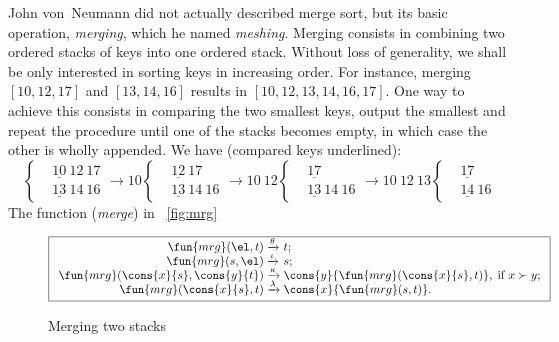John von~Neumann did not actually described merge sort, but its basic
operation, \emph{merging}, which he named \emph{meshing}. Merging
consists in combining two ordered stacks of keys into one ordered
stack. Without loss of generality, we shall be only interested in
sorting keys in increasing order. For instance, merging \([10,12,17]\)
and \([13,14,16]\) results in \([10,12,13,14,16,17]\). One way to
achieve this consists in comparing the two smallest keys, output the
smallest and repeat the procedure until one of the stacks becomes
empty, in which case the other is wholly appended. We have (compared
keys underlined):
\begin{equation*}
\left\{
\begin{aligned}
&\underline{10}~12~17\\
&\underline{13}~14~16
\end{aligned}
\right.
\rightarrow 10
\left\{
\begin{aligned}
&\underline{12}~17\\
&\underline{13}~14~16
\end{aligned}
\right.
\rightarrow 10~12
\left\{
\begin{aligned}
&\underline{17}\\
&\underline{13}~14~16
\end{aligned}
\right.
\rightarrow 10~12~13
\left\{
\begin{aligned}
&\underline{17}\\
&\underline{14}~16
\end{aligned}
\right.
\end{equation*}
The function  (\emph{merge}) in
\fig~\vref{fig:mrg}
\begin{figure}
\begin{equation*}
\boxed{%
\begin{array}{r@{\;}l@{\;}l}
\fun{mrg}(\el,t)         & \xrightarrow{\smash{\theta}} & t;\\
\fun{mrg}(s,\el)         & \xrightarrow{\smash{\iota}} & s;\\
\fun{mrg}(\cons{x}{s},\cons{y}{t}) & \xrightarrow{\smash{\kappa}}
& \cons{y}{\fun{mrg}(\cons{x}{s},t)},\;\text{if \(x \succ y\)};\\
\fun{mrg}(\cons{x}{s},t) & \xrightarrow{\smash{\lambda}}
                         & \cons{x}{\fun{mrg}(s,t)}.
\end{array}}
\end{equation*}
\caption{Merging two stacks}
\label{fig:mrg}
\end{figure}
